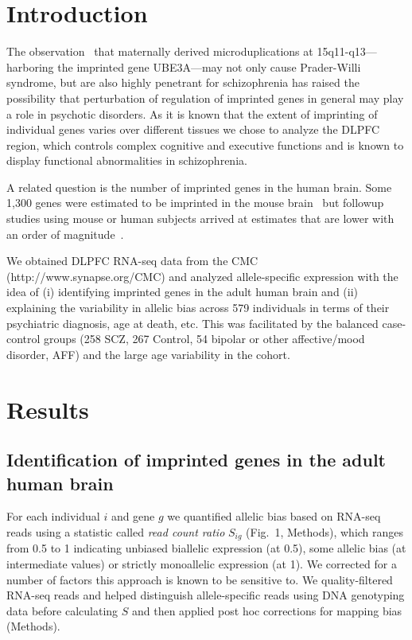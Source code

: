 \documentclass[letterpaper]{article}
\begin{document}
\section*{Introduction}

The observation~\cite{Noor2015,Rees2014} that maternally derived
microduplications at 15q11-q13---harboring the imprinted gene UBE3A---may not
only cause Prader-Willi syndrome, but are also highly penetrant for
schizophrenia has raised the possibility that perturbation of regulation of
imprinted genes in general may play a role in psychotic disorders.  As it is
known that the extent of imprinting of individual genes varies over different
tissues we chose to analyze the DLPFC region, which controls complex cognitive and
executive functions and is known to display functional abnormalities in
schizophrenia.

A related question is the number of imprinted genes in the human brain.  Some
1,300 genes were estimated to be imprinted in the mouse
brain~\cite{Gregg2010a} but followup studies using mouse or human subjects
arrived at estimates that are lower with an order of
magnitude~\cite{Andergassen2017,Babak2015,Baran2015,DeVeale2012,Perez2015}.

We obtained DLPFC RNA-seq data from the CMC~\cite{Fromer2016a}
(http://www.synapse.org/CMC) and analyzed allele-specific
expression with the idea of (i) identifying imprinted genes in the adult human
brain and (ii) explaining the variability in allelic bias across 579
individuals in terms of their psychiatric diagnosis, age at death, etc.  This
was facilitated by the balanced case-control groups (258 SCZ, 267 Control, 54
bipolar or other affective/mood disorder, AFF) and the large age variability
in the cohort.

\section*{Results}

\subsection*{Identification of imprinted genes in the adult human brain}

For each individual \(i\) and gene \(g\) we quantified allelic bias based on
RNA-seq reads using a statistic called \emph{read count ratio} \(S_{ig}\)
(Fig.~1, Methods), which ranges from 0.5 to 1 indicating unbiased
biallelic expression (at 0.5), some allelic bias (at intermediate values) or
strictly monoallelic expression (at 1).  We corrected for a number
of factors this approach is known to be sensitive to.  We quality-filtered
RNA-seq reads and helped distinguish allele-specific reads using DNA
genotyping data before calculating \(S\) and then applied post hoc corrections
for mapping bias (Methods).
\end{document}
